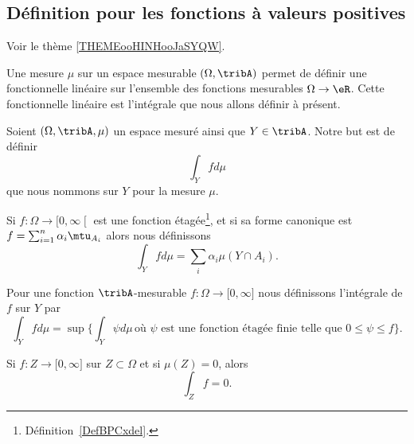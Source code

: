 \subsection{Définition pour les fonctions à valeurs positives}

Voir le thème \ref{THEMEooHINHooJaSYQW}.

Une mesure \( \mu\) sur un espace mesurable \( (\Omega,\tribA)\) permet de définir une fonctionnelle linéaire sur l'ensemble des fonctions mesurables \( \Omega\to \eR\). Cette fonctionnelle linéaire est l'intégrale que nous allons définir à présent.

\begin{definition}  \label{DefTVOooleEst}
	Soient \( (\Omega,\tribA,\mu)\) un espace mesuré ainsi que \( Y\in\tribA\). Notre but est de définir
	\begin{equation}
		\int_Yfd\mu
	\end{equation}
	que nous nommons  sur \( Y\) pour la mesure \( \mu\).
	\begin{subproof}
				\label{ITEMooQVEAooZhRtUG}
		Si \(f \colon \Omega\to \mathopen[ 0,\infty\mathclose[  \) est une fonction étagée\footnote{Définition~\ref{DefBPCxdel}.}, et si sa forme canonique est \( f=\sum_{i=1}^n\alpha_i\mtu_{A_i}\) alors nous définissons
		\begin{equation}        \label{EqooGAFMooZLzjPs}
			\int_Yfd\mu=\sum_i\alpha_i\mu(Y\cap A_i).
		\end{equation}

				\label{ITEMooQGKEooZVhHHq}
		Pour une fonction \( \tribA\)-mesurable \( f\colon \Omega\to \mathopen[ 0 , \infty \mathclose]\) nous définissons l'intégrale de \( f\) sur \( Y\) par
		\begin{equation}        \label{EqDefintYfdmu}
			\int_Yfd\mu=\sup\Big\{ \int_Y\psi d\mu\,\text{où } \psi\text{ est une fonction étagée finie telle que } 0\leq \psi\leq f \Big\}.
		\end{equation}

	\end{subproof}
\end{definition}

\begin{corollary}	\label{CORooZPLOooXgbtDs}
	Si \(f \colon Z\to \mathopen[ 0,\infty\mathclose]  \) sur \( Z\subset \Omega\) et si \( \mu(Z)=0\), alors
	\begin{equation}
		\int_Zf=0.
	\end{equation}
\end{corollary}


